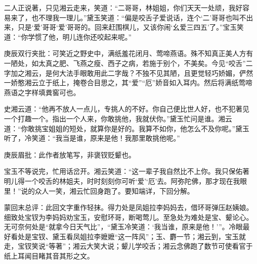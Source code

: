 \begin{parag}
    二人正说著，只见湘云走来，笑道：“二哥哥，林姐姐，你们天天一处顽，我好容易来了，也不理我一理儿。”黛玉笑道：“偏是咬舌子爱说话，连个‘二’哥哥也叫不出来，只是‘爱’哥哥‘爱’哥哥的。回来赶围棋儿，又该你闹‘幺爱三四五’了。”宝玉笑道：“你学惯了他，明儿连你还咬起来呢。”\begin{note}庚辰双行夹批：可笑近之野史中，满纸羞花闭月、莺啼燕语。殊不知真正美人方有一陋处，如太真之肥、飞燕之瘦、西子之病，若施于别个，不美矣。今见“咬舌”二字加之湘云，是何大法手眼敢用此二字哉？不独不见其陋，且更觉轻巧娇媚，俨然一娇憨湘云立于纸上，掩卷合目思之，其“爱”“厄”娇音如入耳内。然后将满纸莺啼燕语之字样填粪窖可也。\end{note}史湘云道：“他再不放人一点儿，专挑人的不好。你自己便比世人好，也不犯著见一个打趣一个。指出一个人来，你敢挑他，我就伏你。”黛玉忙问是谁。湘云道：“你敢挑宝姐姐的短处，就算你是好的。我算不如你，他怎么不及你呢。”黛玉听了，冷笑道：“我当是谁，原来是他！我那里敢挑他呢。”\begin{note}庚辰眉批：此作者放笔写，非褒钗贬颦也。\end{note}宝玉不等说完，忙用话岔开。湘云笑道：“这一辈子我自然比不上你。我只保佑著明儿得一个咬舌的林姐夫，时时刻刻你可听‘爱’‘厄’去。阿弥陀佛，那才现在我眼里！”说的众人一笑，湘云忙回身跑了。要知端详，下回分解。
\end{parag}


\begin{parag}
    \begin{note}蒙回末总评：此回文字重作轻抹。得力处是凤姐拉李妈妈去，借环哥弹压赵姨娘。细致处宝钗为李妈妈劝宝玉，安慰环哥，断喝莺儿。至急处为难处是宝、颦论心。无可奈何处是“就拿今日天气比”，“黛玉冷笑道：‘我当谁，原来是他！’”。冷眼最好看处是宝钗、黛玉看凤姐拉李嬷嬷“这一阵风”；玉、麝一节；湘云到，宝玉就走，宝钗笑说“等著”；湘云大笑大说；颦儿学咬舌；湘云念佛跑了数节可使看官于纸上耳闻目睹其音其形之文。\end{note}
\end{parag}